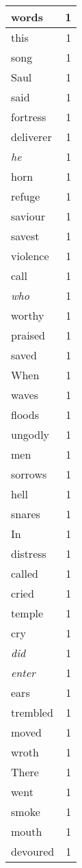 \begin{center}
\begin{longtable}{l|r}
words & 1 \\ \hline
this & 1 \\ \hline
song & 1 \\ \hline
Saul & 1 \\ \hline
said & 1 \\ \hline
fortress & 1 \\ \hline
deliverer & 1 \\ \hline
\emph{he} & 1 \\ \hline
horn & 1 \\ \hline
refuge & 1 \\ \hline
saviour & 1 \\ \hline
savest & 1 \\ \hline
violence & 1 \\ \hline
call & 1 \\ \hline
\emph{who} & 1 \\ \hline
worthy & 1 \\ \hline
praised & 1 \\ \hline
saved & 1 \\ \hline
When & 1 \\ \hline
waves & 1 \\ \hline
floods & 1 \\ \hline
ungodly & 1 \\ \hline
men & 1 \\ \hline
sorrows & 1 \\ \hline
hell & 1 \\ \hline
snares & 1 \\ \hline
In & 1 \\ \hline
distress & 1 \\ \hline
called & 1 \\ \hline
cried & 1 \\ \hline
temple & 1 \\ \hline
cry & 1 \\ \hline
\emph{did} & 1 \\ \hline
\emph{enter} & 1 \\ \hline
ears & 1 \\ \hline
trembled & 1 \\ \hline
moved & 1 \\ \hline
wroth & 1 \\ \hline
There & 1 \\ \hline
went & 1 \\ \hline
smoke & 1 \\ \hline
mouth & 1 \\ \hline
devoured & 1 \\ \hline

\end{longtable}
\end{center}
